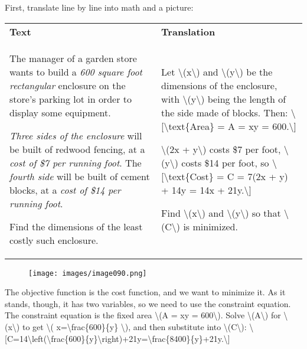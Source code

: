 First, translate line by line into math and a picture:

\begin{longtable}[]{@{}ll@{}}
\toprule
\endhead
\begin{minipage}[t]{0.47\columnwidth}\raggedright
\textbf{Text}\strut
\end{minipage} & \begin{minipage}[t]{0.47\columnwidth}\raggedright
\textbf{Translation}\strut
\end{minipage}\tabularnewline
\begin{minipage}[t]{0.47\columnwidth}\raggedright
The manager of a garden store wants to build a \emph{600 square foot
rectangular} enclosure on the store's parking lot in order to display
some equipment.

\emph{Three sides of the enclosure} will be built of redwood fencing, at
a \emph{cost of \$7 per running foot}. The \emph{fourth side} will be
built of cement blocks, at a \emph{cost of \$14 per running foot}.

Find the dimensions of the least costly such enclosure.\strut
\end{minipage} & \begin{minipage}[t]{0.47\columnwidth}\raggedright
Let \textbackslash{}(x\textbackslash{}) and
\textbackslash{}(y\textbackslash{}) be the dimensions of the enclosure,
with \textbackslash{}(y\textbackslash{}) being the length of the side
made of blocks. Then: \textbackslash{}{[}\textbackslash{}text\{Area\} =
A = xy = 600.\textbackslash{}{]}

\textbackslash{}(2x + y\textbackslash{}) costs \$7 per foot,
\textbackslash{}(y\textbackslash{}) costs \$14 per foot, so
\textbackslash{}{[}\textbackslash{}text\{Cost\} = C = 7(2x + y) + 14y =
14x + 21y.\textbackslash{}{]}

Find \textbackslash{}(x\textbackslash{}) and
\textbackslash{}(y\textbackslash{}) so that
\textbackslash{}(C\textbackslash{}) is minimized.\strut
\end{minipage}\tabularnewline
\bottomrule
\end{longtable}

\begin{figure}
\centering
\texttt{[image: images/image090.png]}
\caption{}
\end{figure}

The objective function is the cost function, and we want to minimize it.
As it stands, though, it has two variables, so we need to use the
constraint equation. The constraint equation is the fixed area
\textbackslash{}(A = xy = 600\textbackslash{}). Solve
\textbackslash{}(A\textbackslash{}) for
\textbackslash{}(x\textbackslash{}) to get \textbackslash{}(
x=\textbackslash{}frac\{600\}\{y\} \textbackslash{}), and then
substitute into \textbackslash{}(C\textbackslash{}):
\textbackslash{}{[}C=14\textbackslash{}left(\textbackslash{}frac\{600\}\{y\}\textbackslash{}right)+21y=\textbackslash{}frac\{8400\}\{y\}+21y.\textbackslash{}{]}

